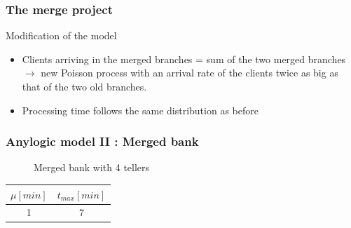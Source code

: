 \documentclass[10pt]{beamer}
\begin{document}
\begin{frame}
  \frametitle{The merge project}
  \begin{block}{Modification of the model}
  \begin{itemize}
  \item  Clients arriving in the merged branches = sum of the two merged branches
  $\rightarrow $ new Poisson process with an arrival rate of the clients twice as big as that of the two old branches.
  \item Processing time follows the same distribution as before
  \end{itemize}
  \end{block}
 
\end{frame}

\begin{frame}
  \frametitle{Anylogic model II : Merged bank}
  \begin{figure}
  \centering
{}

\caption{Merged bank with 4 tellers}
\end{figure}
  
  
\begin{table}
\centering
\begin{tabular}{|c|c|}
\hline
$\mu[min]$ & $t_{max}[min]$ \\
\hline
1 & 7 \\
\hline
\end{tabular} 
\end{table}

\end{frame}
\end{document}
